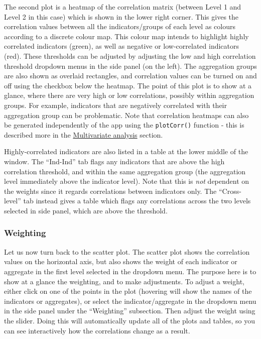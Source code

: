 \documentclass[
]{book}
\begin{document}
The second plot is a heatmap of the correlation matrix (between Level 1 and Level 2 in this case) which is shown in the lower right corner. This gives the correlation values between all the indicators/groups of each level as colours according to a discrete colour map. This colour map intends to highlight highly correlated indicators (green), as well as negative or low-correlated indicators (red). These thresholds can be adjusted by adjusting the low and high correlation threshold dropdown menus in the side panel (on the left). The aggregation groups are also shown as overlaid rectangles, and correlation values can be turned on and off using the checkbox below the heatmap. The point of this plot is to show at a glance, where there are very high or low correlations, possibly within aggregation groups. For example, indicators that are negatively correlated with their aggregation group can be problematic. Note that correlation heatmaps can also be generated independently of the app using the \texttt{plotCorr()} function - this is described more in the \protect\hyperlink{multivariate-analysis}{Multivariate analysis} section.

Highly-correlated indicators are also listed in a table at the lower middle of the window. The ``Ind-Ind'' tab flags any indicators that are above the high correlation threshold, and within the same aggregation group (the aggregation level immediately above the indicator level). Note that this is \emph{not} dependent on the weights since it regards correlations between indicators only. The ``Cross-level'' tab instead gives a table which flags any correlations across the two levels selected in side panel, which are above the threshold.

\hypertarget{weighting-2}{%
\subsubsection{Weighting}\label{weighting-2}}

Let us now turn back to the scatter plot. The scatter plot shows the correlation values on the horizontal axis, but also shows the weight of each indicator or aggregate in the first level selected in the dropdown menu. The purpose here is to show at a glance the weighting, and to make adjustments. To adjust a weight, either click on one of the points in the plot (hovering will show the names of the indicators or aggregates), or select the indicator/aggregate in the dropdown menu in the side panel under the ``Weighting'' subsection. Then adjust the weight using the slider. Doing this will automatically update all of the plots and tables, so you can see interactively how the correlations change as a result.
\end{document}
